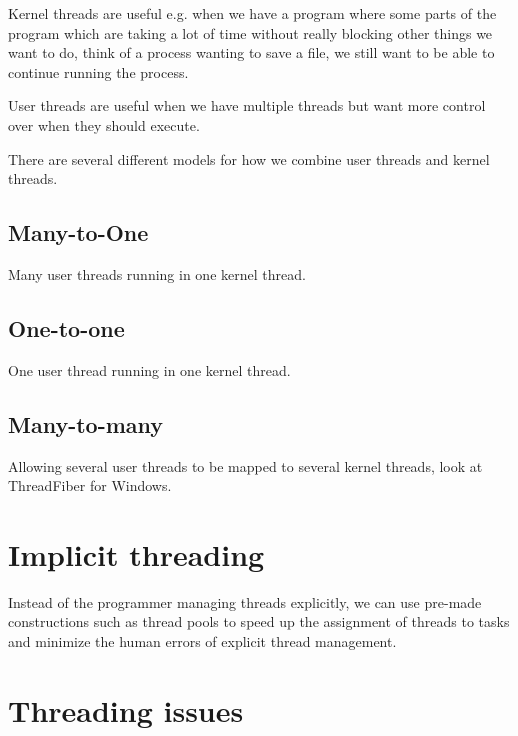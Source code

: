Kernel threads are useful e.g. when we have a program where some parts of the program which are taking a lot of time without really blocking other things we want to do, think of a process wanting to save a file, we still want to be able to continue running the process.

User threads are useful when we have multiple threads but want more control over when they should execute.

There are several different models for how we combine user threads and kernel threads.

\subsection{Many-to-One}
Many user threads running in one kernel thread.
\subsection{One-to-one}
One user thread running in one kernel thread.
\subsection{Many-to-many}
Allowing several user threads to be mapped to several kernel threads, look at ThreadFiber for Windows.




\section{Implicit threading}
Instead of the programmer managing threads explicitly, we can use pre-made constructions such as thread pools to speed up the assignment of threads to tasks and minimize the human errors of explicit thread management.

\section{Threading issues}